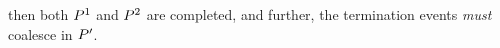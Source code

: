 then both $P^1$ and $P^2$ are completed, and further, the termination events
\emph{must} coalesce in $P'$.



